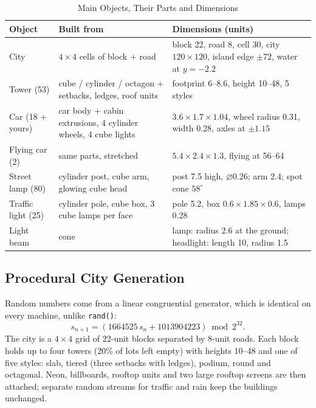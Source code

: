 \documentclass[12pt, a4paper]{report}
\begin{document}
\begin{table}[!htbp]
  \caption{Main Objects, Their Parts and Dimensions}
  \label{tab:3.2g}
  \centering
  {\fontsize{10}{12.5}\selectfont
    \begin{tabular}{|p{1.15in}|p{2.05in}|p{2.2in}|}
      \hline
      \textbf{Object} & \textbf{Built from} & \textbf{Dimensions (units)} \\
      \hline
      City & $4\times4$ cells of block + road & block 22, road 8, cell 30, city $120\times120$, island edge $\pm72$, water at $y=-2.2$ \\
      \hline
      Tower (53) & cube / cylinder / octagon + setbacks, ledges, roof units & footprint 6--8.6, height 10--48, 5 styles \\
      \hline
      Car (18 + yours) & car body + cabin extrusions, 4 cylinder wheels, 4 cube lights & $3.6\times1.7\times1.04$, wheel radius 0.31, width 0.28, axles at $\pm1.15$ \\
      \hline
      Flying car (2) & same parts, stretched & $5.4\times2.4\times1.3$, flying at 56--64 \\
      \hline
      Street lamp (80) & cylinder post, cube arm, glowing cube head & post 7.5 high, $\varnothing$0.26; arm 2.4; spot cone $58^\circ$ \\
      \hline
      Traffic light (25) & cylinder pole, cube box, 3 cube lamps per face & pole 5.2, box $0.6\times1.85\times0.6$, lamps 0.28 \\
      \hline
      Light beam & cone & lamp: radius 2.6 at the ground; headlight: length 10, radius 1.5 \\
      \hline
    \end{tabular}
  }
\end{table}

\subsection{Procedural City Generation}

\begin{justify}
  {\fontsize{12}{13.8}\selectfont
    Random numbers come from a linear congruential generator, which is identical on every machine, unlike \texttt{rand()}:
    \begin{equation}
      s_{n+1} = (1664525\,s_n + 1013904223) \bmod 2^{32}.
    \end{equation}
    The city is a $4\times4$ grid of 22-unit blocks separated by 8-unit roads. Each block holds up to four towers (20\% of lots left empty) with heights 10--48 and one of five styles: slab, tiered (three setbacks with ledges), podium, round and octagonal. Neon, billboards, rooftop units and two large rooftop screens are then attached; separate random streams for traffic and rain keep the buildings unchanged.
  }
\end{justify}
\end{document}
